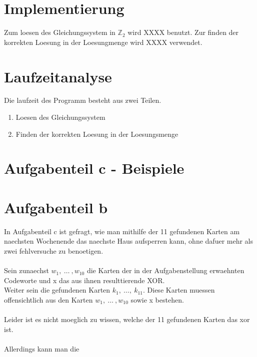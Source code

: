 \documentclass[a4paper,10pt,ngerman]{scrartcl}
\begin{document}
\section{Implementierung}
Zum loesen des Gleichungssystem in \(\mathbb{Z}_{2}\) wird XXXX benutzt.
Zur finden der korrekten Loesung in der Loesungmenge wird XXXX verwendet.

\section{Laufzeitanalyse}
Die laufzeit des Programm besteht aus zwei Teilen.
\begin{enumerate}
	\item Loesen des Gleichungssystem
	\item Finden der korrekten Loesung in der Loesungsmenge
\end{enumerate}

\section{Aufgabenteil c - Beispiele}

\section{Aufgabenteil b}
In Aufgabenteil c ist gefragt, wie man mithilfe der 11 gefundenen Karten am naechsten Wochenende das naechste Haus aufsperren kann, ohne dafuer mehr als zwei fehlversuche zu benoetigen.
\\\\
Sein zunaechst \(w_1, \ \dots \ , w_10\) die Karten der in der Aufgabenstellung erwaehnten Codeworte und x das aus ihnen resulttierende XOR.\\
Weiter sein die gefundenen Karten \(k_1, \ \dots , \ k_11\). Diese Karten muessen offensichtlich aus den Karten \(w_1, \ \dots \ , w_10\) sowie x bestehen.
\\\\
Leider ist es nicht moeglich zu wissen, welche der 11 gefundenen Karten das xor ist.\\\\
Allerdings kann man die
\end{document}

